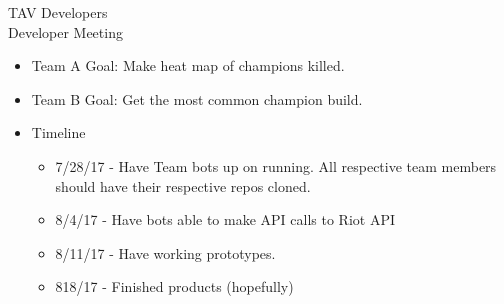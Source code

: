 \documentclass{article}
\begin{document}
\begin{Minutes}{TAV Developers\\Developer Meeting}
\begin{itemize}
	\item Team A Goal: Make heat map of champions killed.
	\item Team B Goal: Get the most common champion build. 
	\item Timeline
	\begin{itemize}
		\item 7/28/17 - Have Team bots up on running. All respective team members should have their respective repos cloned.
		\item 8/4/17 - Have bots able to make API calls to Riot API
		\item 8/11/17 - Have working prototypes.
		\item 818/17 - Finished products (hopefully)
	\end{itemize}		
\end{itemize}


\thispagestyle{creditfooter}

\end{Minutes}
\end{document}
